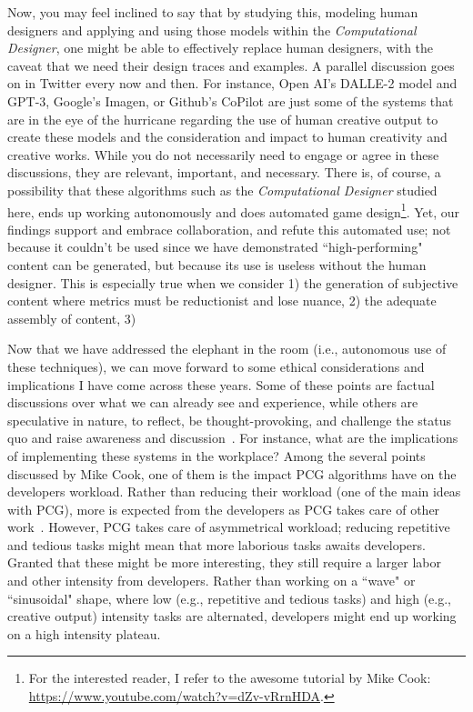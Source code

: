 Now, you may feel inclined to say that by studying this, modeling human designers and applying and using those models within the \emph{Computational Designer}, one might be able to effectively replace human designers, with the caveat that we need their design traces and examples. A parallel discussion goes on in Twitter every now and then. For instance, Open AI's DALLE-2 model and GPT-3, Google's Imagen, or Github's CoPilot are just some of the systems that are in the eye of the hurricane regarding the use of human creative output to create these models and the consideration and impact to human creativity and creative works. While you do not necessarily need to engage or agree in these discussions, they are relevant, important, and necessary. There is, of course, a possibility that these algorithms such as the \emph{Computational Designer} studied here, ends up working autonomously and does automated game design\footnote{For the interested reader, I refer to the awesome tutorial by Mike Cook: \url{https://www.youtube.com/watch?v=dZv-vRrnHDA}.}. Yet, our findings support and embrace collaboration, and refute this automated use; not because it couldn't be used since we have demonstrated ``high-performing" content can be generated, but because its use is useless without the human designer. This is especially true when we consider 1) the generation of subjective content where metrics must be reductionist and lose nuance, 2) the adequate assembly of content, 3) 

Now that we have addressed the elephant in the room (i.e., autonomous use of these techniques), we can move forward to some ethical considerations and implications I have come across these years. Some of these points are factual discussions over what we can already see and experience, while others are speculative in nature, to reflect, be thought-provoking, and challenge the status quo and raise awareness and discussion~\cite{fiesler_innovating_2021,klassen_run_2022}. For instance, what are the implications of implementing these systems in the workplace? Among the several points discussed by Mike Cook, one of them is the impact PCG algorithms have on the developers workload. Rather than reducing their workload (one of the main ideas with PCG), more is expected from the developers as PCG takes care of other work~\cite{cook_social_2021}. However, PCG takes care of asymmetrical workload; reducing repetitive and tedious tasks might mean that more laborious tasks awaits developers. Granted that these might be more interesting, they still require a larger labor and other intensity from developers. Rather than working on a ``wave" or ``sinusoidal" shape, where low (e.g., repetitive and tedious tasks) and high (e.g., creative output) intensity tasks are alternated, developers might end up working on a high intensity plateau.

